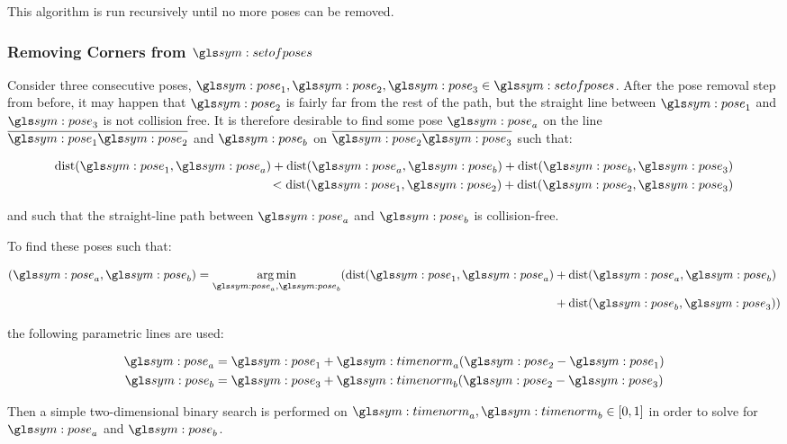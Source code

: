 			This algorithm is run recursively until no more poses can be
			removed.

		\subsubsection{Removing Corners from $\setofposes$}

			Consider three consecutive poses, $\pose_1, \pose_2, \pose_3 \in
			\setofposes$. After the pose removal step from before, it may happen
			that $\pose_2$ is fairly far from the rest of the path, but the
			straight line between $\pose_1$ and $\pose_3$ is not collision free.
			It is therefore desirable to find some pose $\pose_a$ on the line
			$\vecline{\pose_1}{\pose_2}$ and $\pose_b$ on
			$\vecline{\pose_2}{\pose_3}$ such that:

			\begin{equation}
				\begin{split}
					\dist(\pose_1,\pose_a) + \dist(\pose_a,\pose_b) +
					\dist(\pose_b,\pose_3)
					\\<
					\dist(\pose_1,\pose_2) + \dist(\pose_2,\pose_3)
				\end{split}
			\end{equation}

			and such that the straight-line path between $\pose_a$ and $\pose_b$
			is collision-free.

			To find these poses such that:

			\begin{equation}
				\begin{split}
					(\pose_a, \pose_b) = \argmin_{\pose_a, \pose_b}
						(
							\dist(\pose_1, \pose_a)
							&+ \dist(\pose_a, \pose_b)\\
							&+ \dist(\pose_b, \pose_3)
						)
				\end{split}
			\end{equation}

			the following parametric lines are used:

			\begin{align}
				\pose_a &= \pose_1 + \timenorm_a(\pose_2 - \pose_1)\\
				\pose_b &= \pose_3 + \timenorm_b(\pose_2 - \pose_3)
			\end{align}

			Then a simple two-dimensional binary search is performed on
			\(
				\timenorm_a, \timenorm_b \in [0, 1]
			\)
			in order to solve for $\pose_a$ and $\pose_b$.


